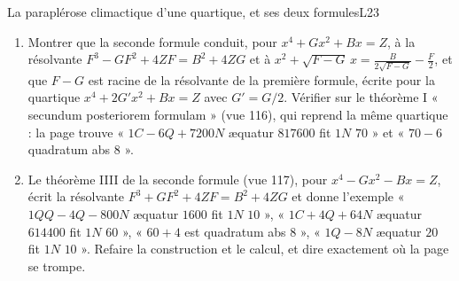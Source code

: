 \documentclass[11pt,a4paper]{article}
\begin{document}
\begin{exercice}{La paraplérose climactique d'une quartique, et ses deux formules}{L2}{3}
\begin{enumerate}
  Les calculer pour l'exemple.
\item Montrer que la seconde formule conduit, pour $x^4 + Gx^2 + Bx = Z$, à la
  résolvante $F^3 - GF^2 + 4ZF = B^2 + 4ZG$ et à
  $x^2 + \sqrt{F - G}\,x = \frac{B}{2\sqrt{F - G}} - \frac{F}{2}$, et que $F - G$ est
  racine de la résolvante de la première formule, écrite pour la quartique
  $x^4 + 2G'x^2 + Bx = Z$ avec $G' = G/2$. Vérifier
  sur le théorème I « secundum posteriorem formulam » (vue 116), qui reprend la
  même quartique : la page trouve « $1C - 6Q + 7200N$ æquatur $817600$ fit $1N$
  $70$ » et « $70 - 6$ quadratum abs $8$ ».
\item Le théorème IIII de la seconde formule (vue 117), pour
  $x^4 - Gx^2 - Bx = Z$, écrit la résolvante $F^3 + GF^2 + 4ZF = B^2 + 4ZG$ et
  donne l'exemple « $1QQ - 4Q - 800N$ æquatur $1600$ fit $1N$ $10$ », « $1C + 4Q +
  64N$ æquatur $614400$ fit $1N$ $60$ », « $60 + 4$ est quadratum abs $8$ »,
  « $1Q - 8N$ æquatur $20$ fit $1N$ $10$ ». Refaire la construction et le calcul,
  et dire exactement où la page se trompe.
\end{enumerate}
\end{exercice}
\end{document}
